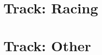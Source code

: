 \part{Track: Racing \label{part:track-field}}
\parttoc
\thispagestyle{empty}






\part{Track: Other \label{part:track-other}}





